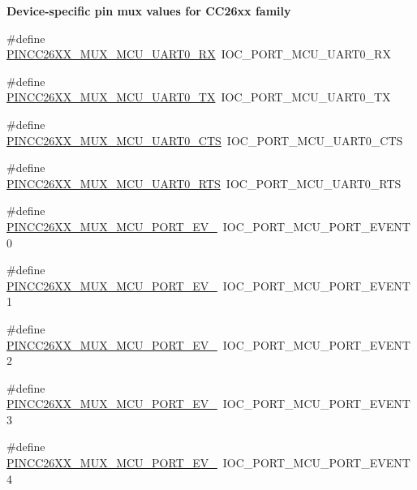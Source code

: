 \begin{Indent}{\bf Device-\/specific pin mux values for C\+C26xx family}
\begin{DoxyCompactItemize}
\item 
\#define \hyperlink{_p_i_n_c_c26_x_x_8h_ab2932b3af0495872bf444b90cb83d2c0}{P\+I\+N\+C\+C26\+X\+X\+\_\+\+M\+U\+X\+\_\+\+M\+C\+U\+\_\+\+U\+A\+R\+T0\+\_\+\+R\+X}~I\+O\+C\+\_\+\+P\+O\+R\+T\+\_\+\+M\+C\+U\+\_\+\+U\+A\+R\+T0\+\_\+\+R\+X
\item 
\#define \hyperlink{_p_i_n_c_c26_x_x_8h_a5b92514b6f947d9d333927e7f6973677}{P\+I\+N\+C\+C26\+X\+X\+\_\+\+M\+U\+X\+\_\+\+M\+C\+U\+\_\+\+U\+A\+R\+T0\+\_\+\+T\+X}~I\+O\+C\+\_\+\+P\+O\+R\+T\+\_\+\+M\+C\+U\+\_\+\+U\+A\+R\+T0\+\_\+\+T\+X
\item 
\#define \hyperlink{_p_i_n_c_c26_x_x_8h_a522aeda2895c5cb3b0193b2ef3c2d718}{P\+I\+N\+C\+C26\+X\+X\+\_\+\+M\+U\+X\+\_\+\+M\+C\+U\+\_\+\+U\+A\+R\+T0\+\_\+\+C\+T\+S}~I\+O\+C\+\_\+\+P\+O\+R\+T\+\_\+\+M\+C\+U\+\_\+\+U\+A\+R\+T0\+\_\+\+C\+T\+S
\item 
\#define \hyperlink{_p_i_n_c_c26_x_x_8h_a51f1fec524b48909fcfd7f619fb0c008}{P\+I\+N\+C\+C26\+X\+X\+\_\+\+M\+U\+X\+\_\+\+M\+C\+U\+\_\+\+U\+A\+R\+T0\+\_\+\+R\+T\+S}~I\+O\+C\+\_\+\+P\+O\+R\+T\+\_\+\+M\+C\+U\+\_\+\+U\+A\+R\+T0\+\_\+\+R\+T\+S
\item 
\#define \hyperlink{_p_i_n_c_c26_x_x_8h_a09712aa3a7368b7c38a9bbc7c586932a}{P\+I\+N\+C\+C26\+X\+X\+\_\+\+M\+U\+X\+\_\+\+M\+C\+U\+\_\+\+P\+O\+R\+T\+\_\+\+E\+V\+\_}~I\+O\+C\+\_\+\+P\+O\+R\+T\+\_\+\+M\+C\+U\+\_\+\+P\+O\+R\+T\+\_\+\+E\+V\+E\+N\+T0
\item 
\#define \hyperlink{_p_i_n_c_c26_x_x_8h_a0eaba3a4172b8e3a5386f0ae915b7019}{P\+I\+N\+C\+C26\+X\+X\+\_\+\+M\+U\+X\+\_\+\+M\+C\+U\+\_\+\+P\+O\+R\+T\+\_\+\+E\+V\+\_}~I\+O\+C\+\_\+\+P\+O\+R\+T\+\_\+\+M\+C\+U\+\_\+\+P\+O\+R\+T\+\_\+\+E\+V\+E\+N\+T1
\item 
\#define \hyperlink{_p_i_n_c_c26_x_x_8h_a55943b8f44a0507753f93e5c10372446}{P\+I\+N\+C\+C26\+X\+X\+\_\+\+M\+U\+X\+\_\+\+M\+C\+U\+\_\+\+P\+O\+R\+T\+\_\+\+E\+V\+\_}~I\+O\+C\+\_\+\+P\+O\+R\+T\+\_\+\+M\+C\+U\+\_\+\+P\+O\+R\+T\+\_\+\+E\+V\+E\+N\+T2
\item 
\#define \hyperlink{_p_i_n_c_c26_x_x_8h_aaa2fe8a21207a1e8e4c15e1724d0ffd0}{P\+I\+N\+C\+C26\+X\+X\+\_\+\+M\+U\+X\+\_\+\+M\+C\+U\+\_\+\+P\+O\+R\+T\+\_\+\+E\+V\+\_}~I\+O\+C\+\_\+\+P\+O\+R\+T\+\_\+\+M\+C\+U\+\_\+\+P\+O\+R\+T\+\_\+\+E\+V\+E\+N\+T3
\item 
\#define \hyperlink{_p_i_n_c_c26_x_x_8h_ad54431adae65b3ae0b8e7dad96f46e4e}{P\+I\+N\+C\+C26\+X\+X\+\_\+\+M\+U\+X\+\_\+\+M\+C\+U\+\_\+\+P\+O\+R\+T\+\_\+\+E\+V\+\_}~I\+O\+C\+\_\+\+P\+O\+R\+T\+\_\+\+M\+C\+U\+\_\+\+P\+O\+R\+T\+\_\+\+E\+V\+E\+N\+T4
\item 

\end{DoxyCompactItemize}
\end{Indent}
